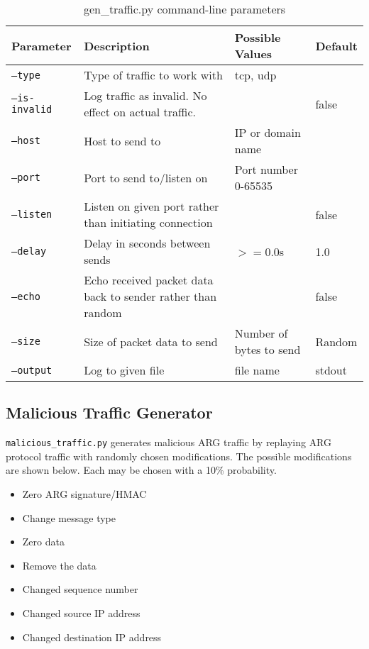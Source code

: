 \begin{table}
\caption{gen\_traffic.py command-line parameters}
\label{tbl:gen_traffic_param}
\centering
\begin{tabular}{l|p{2in}|l|l}
Parameter & Description & Possible Values & Default\\
\hline
\texttt{--type} & Type of traffic to work with & tcp, udp & \\
\texttt{--is-invalid} & Log traffic as invalid. No effect on actual traffic. & & false\\
\texttt{--host} & Host to send to & \ac{IP} or domain name & \\
\texttt{--port} & Port to send to/listen on & Port number 0-65535 & \\
\texttt{--listen} & Listen on given port rather than initiating connection & & false\\
\texttt{--delay} & Delay in seconds between sends & $>=$0.0s & 1.0\\
\texttt{--echo} & Echo received packet data back to sender rather than random & & false\\
\texttt{--size} & Size of packet data to send & Number of bytes to send & Random\\
\texttt{--output} & Log to given file & file name & stdout
\end{tabular}
\end{table}

\subsection{Malicious Traffic Generator}
\par \texttt{malicious\_traffic.py} generates malicious ARG traffic by replaying \ac{ARG} protocol traffic with randomly chosen modifications. The possible modifications are shown below. Each may be chosen with a 10\% probability.

{\singlespace
\begin{itemize}
\item Zero \ac{ARG} signature/\ac{HMAC}
\item Change message type
\item Zero data
\item Remove the data
\item Changed sequence number
\item Changed source \ac{IP} address
\item Changed destination \ac{IP} address
\end{itemize}
}

